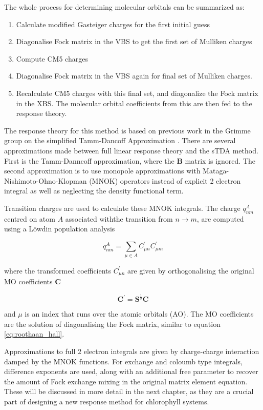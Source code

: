 The whole process for determining molecular orbitals can be summarized as:
\begin{enumerate}
	\item Calculate modified Gasteiger charges for the first initial guess
	\item Diagonalise Fock matrix in the VBS to get the first set of Mulliken charges
	\item Compute CM5 charges
	\item Diagonalise Fock matrix in the VBS again for final set of Mulliken charges.
	\item Recalculate CM5 charges with this final set, and diagonalize the Fock matrix in the XBS. The molecular orbital coefficients from this are then fed to the response theory.
\end{enumerate}

The response theory for this method is based on previous work in the Grimme 
group on the simplified Tamm-Dancoff Approximation \cite{Grimme2013}.
There are several approximations made between full linear response theory and
the sTDA method. First is the Tamm-Danncoff approximation, where the $\mathbf{B}$
matrix is ignored. The second approximation is to use monopole approximations with
Mataga-Nishimoto-Ohno-Klopman (MNOK) operators instead of explicit 2 electron integral
as well as neglecting the density functional term.

Transition charges are used to calculate these MNOK integrals. The charge $q^A_{nm}$
centred on atom $A$ associated withthe transition from $ n \rightarrow m$, are
computed using a Löwdin population analysis

\begin{equation}
q_{nm}^A = \sum_{\mu \in A} C^\prime_{\mu n} C^\prime_{\mu m}
\end{equation}

where the transformed coefficients $C^\prime_{\mu n}$ are given by orthogonalising
the original MO coefficients $\textbf{C}$

\begin{equation}
\textbf{C}^\prime = \textbf{S}^{\frac{1}{2}} \textbf{C}
\end{equation}

and $\mu$ is an index that runs over the atomic orbitals (AO). The MO coefficients
are the solution of diagonalising the Fock matrix, similar to equation \ref{eq:roothaan_hall}.

Approximations to full 2 electron integrals are given by charge-charge interaction
damped by the MNOK\cite{Nishimoto1957}\cite{Ohno1964}\cite{Klopman1964} functions.
For exchange and coloumb type integrals, difference exponents are used, along with
an additional free parameter to recover the amount of Fock exchange mixing in
the original matrix element equation. These will be discussed in more detail in
the next chapter, as they are a crucial part of designing a new response method 
for chlorophyll systems.

